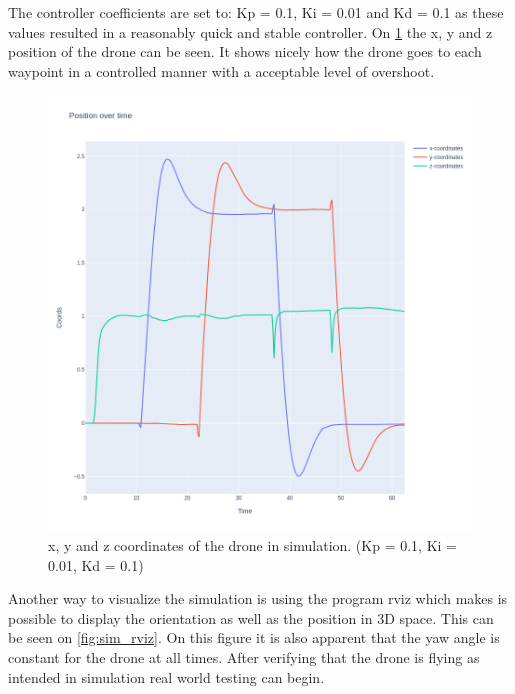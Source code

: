 \documentclass[conference]{IEEEtran}
\begin{document}
The controller coefficients are set to: Kp = 0.1, Ki = 0.01 and Kd = 0.1 as these values resulted in a reasonably quick and stable controller. On \cref{fig:sim_pos} the x, y and z position of the drone can be seen. It shows nicely how the drone goes to each waypoint in a controlled manner with a acceptable level of overshoot.  

\begin{figure}[hbtp]
	\centering
	\includegraphics[width=1.0\linewidth]{images/task2_sim_pos.png}
	\caption{x, y and z coordinates of the drone in simulation. (Kp = 0.1, Ki = 0.01, Kd = 0.1)}
	\label{fig:sim_pos}
\end{figure}

Another way to visualize the simulation is using the program rviz which makes is possible to display the orientation as well as the position in 3D space. This can be seen on \cref{fig:sim_rviz}. On this figure it is also apparent that the yaw angle is constant for the drone at all times. 
After verifying that the drone is flying as intended in simulation real world testing can begin.
\end{document}
